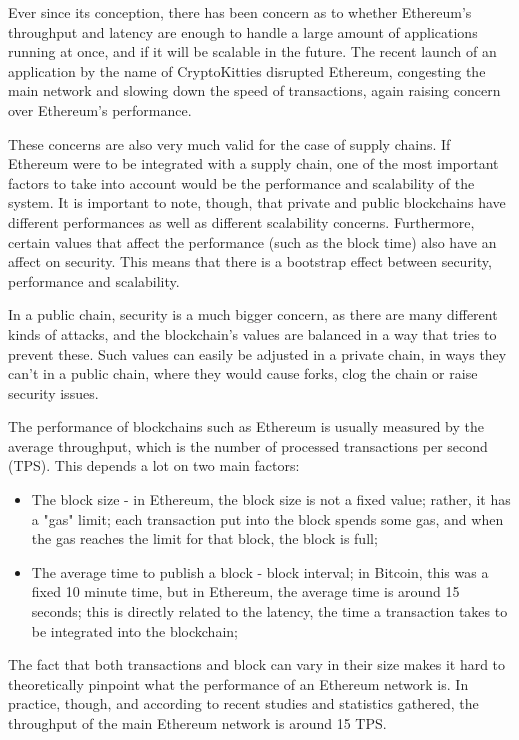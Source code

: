 Ever since its conception, there has been concern as to whether Ethereum's throughput and latency are enough to handle a large amount of applications running at once, and if it will be scalable in the future. The recent launch of an application by the name of CryptoKitties disrupted Ethereum, congesting the main network and slowing down the speed of transactions, again raising concern over Ethereum's performance.

These concerns are also very much valid for the case of supply chains. If Ethereum were to be integrated with a supply chain, one of the most important factors to take into account would be the performance and scalability of the system. It is important to note, though, that private and public blockchains have different performances as well as different scalability concerns. Furthermore, certain values that affect the performance (such as the block time) also have an affect on security. This means that there is a bootstrap effect between security, performance and scalability.

In a public chain, security is a much bigger concern, as there are many different kinds of attacks, and the blockchain's values are balanced in a way that tries to prevent these. Such values can easily be adjusted in a private chain, in ways they can't in a public chain, where they would cause forks, clog the chain or raise security issues. 

The performance of blockchains such as Ethereum is usually measured by the average throughput, which is the number of processed transactions per second (TPS). This depends a lot on two main factors:
\begin{itemize}
\item The block size - in Ethereum, the block size is not a fixed value; rather, it has a "gas" limit; each transaction put into the block spends some gas, and when the gas reaches the limit for that block, the block is full;
\item The average time to publish a block - block interval; in Bitcoin, this was a fixed 10 minute time, but in Ethereum, the average time is around 15 seconds; this is directly related to the latency, the time a transaction takes to be integrated into the blockchain;
\end{itemize}

The fact that both transactions and block can vary in their size makes it hard to theoretically pinpoint what the performance of an Ethereum network is. In practice, though, and according to recent studies and statistics gathered, the throughput of the main Ethereum network is around 15 TPS.


